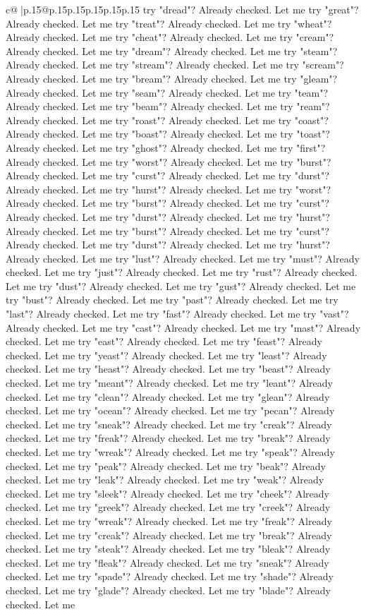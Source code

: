 \documentclass{article}
\begin{document}
{\begin{supertabular}{c@{$\;$}|p{.15\linewidth}@{}p{.15\linewidth}p{.15\linewidth}p{.15\linewidth}p{.15\linewidth}p{.15\linewidth}}
{{{try "dread"? Already checked. Let me try "great"? Already checked. Let me try "treat"? Already checked. Let me try "wheat"? Already checked. Let me try "cheat"? Already checked. Let me try "cream"? Already checked. Let me try "dream"? Already checked. Let me try "steam"? Already checked. Let me try "stream"? Already checked. Let me try "scream"? Already checked. Let me try "bream"? Already checked. Let me try "gleam"? Already checked. Let me try "seam"? Already checked. Let me try "team"? Already checked. Let me try "beam"? Already checked. Let me try "ream"? Already checked. Let me try "roast"? Already checked. Let me try "coast"? Already checked. Let me try "boast"? Already checked. Let me try "toast"? Already checked. Let me try "ghost"? Already checked. Let me try "first"? Already checked. Let me try "worst"? Already checked. Let me try "burst"? Already checked. Let me try "curst"? Already checked. Let me try "durst"? Already checked. Let me try "hurst"? Already checked. Let me try "worst"? Already checked. Let me try "burst"? Already checked. Let me try "curst"? Already checked. Let me try "durst"? Already checked. Let me try "hurst"? Already checked. Let me try "burst"? Already checked. Let me try "curst"? Already checked. Let me try "durst"? Already checked. Let me try "hurst"? Already checked. Let me try "lust"? Already checked. Let me try "must"? Already checked. Let me try "just"? Already checked. Let me try "rust"? Already checked. Let me try "dust"? Already checked. Let me try "gust"? Already checked. Let me try "bust"? Already checked. Let me try "past"? Already checked. Let me try "last"? Already checked. Let me try "fast"? Already checked. Let me try "vast"? Already checked. Let me try "cast"? Already checked. Let me try "mast"? Already checked. Let me try "east"? Already checked. Let me try "feast"? Already checked. Let me try "yeast"? Already checked. Let me try "least"? Already checked. Let me try "heast"? Already checked. Let me try "beast"? Already checked. Let me try "meant"? Already checked. Let me try "leant"? Already checked. Let me try "clean"? Already checked. Let me try "glean"? Already checked. Let me try "ocean"? Already checked. Let me try "pecan"? Already checked. Let me try "sneak"? Already checked. Let me try "creak"? Already checked. Let me try "freak"? Already checked. Let me try "break"? Already checked. Let me try "wreak"? Already checked. Let me try "speak"? Already checked. Let me try "peak"? Already checked. Let me try "beak"? Already checked. Let me try "leak"? Already checked. Let me try "weak"? Already checked. Let me try "sleek"? Already checked. Let me try "cheek"? Already checked. Let me try "greek"? Already checked. Let me try "creek"? Already checked. Let me try "wreak"? Already checked. Let me try "freak"? Already checked. Let me try "creak"? Already checked. Let me try "break"? Already checked. Let me try "steak"? Already checked. Let me try "bleak"? Already checked. Let me try "fleak"? Already checked. Let me try "sneak"? Already checked. Let me try "spade"? Already checked. Let me try "shade"? Already checked. Let me try "glade"? Already checked. Let me try "blade"? Already checked. Let me }}}
\end{supertabular}}
\end{document}
